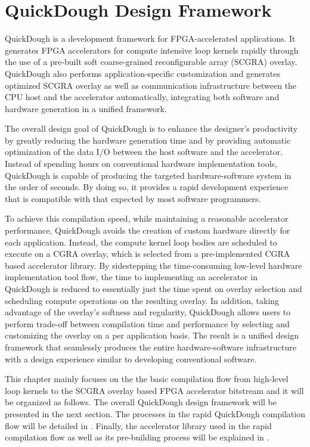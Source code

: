 \chapter{QuickDough Design Framework} \label{chapter:framework}
QuickDough is a development framework for FPGA-accelerated applications. It generates FPGA accelerators for compute intensive loop kernels rapidly through the use of a pre-built soft coarse-grained reconfigurable array (SCGRA) overlay. QuickDough also performs application-specific customization and generates optimized SCGRA overlay as well as communication infrastructure between the CPU host and the accelerator automatically, integrating both software and hardware generation in a unified framework.

The overall design goal of QuickDough is to enhance the designer's productivity by greatly reducing the hardware generation time and by providing automatic optimization of the data I/O between the host software and the accelerator. Instead of spending hours on conventional hardware implementation tools, QuickDough is capable of producing the targeted hardware-software system in the order of seconds. By doing so, it provides a rapid development experience that is compatible with that expected by most software programmers.

To achieve this compilation speed, while maintaining a reasonable accelerator performance, QuickDough avoids the creation of custom hardware directly for each application. Instead, the compute kernel loop bodies are scheduled to execute on a CGRA overlay, which is selected from a pre-implemented CGRA based accelerator library. By sidestepping the time-consuming low-level hardware implementation tool flow, the time to implementing an accelerator in QuickDough is reduced to essentially just the time spent on overlay selection and scheduling compute operations on the resulting overlay. In addition, taking advantage of the overlay's softness and regularity, QuickDough allows users to perform trade-off between compilation time and performance by selecting and customizing the overlay on a per application basis. The result is a unified design framework that seamlessly produces the entire hardware-software infrastructure with a design experience similar to developing conventional software.

This chapter mainly focuses on the the basic compilation flow from high-level loop kernels to the SCGRA overlay based FPGA accelerator bitstream and it will be organized as follows. The overall QuickDough design framework will be presented in the next section. The processes in the rapid QuickDough compilation flow will be detailed in . Finally, the accelerator library used in the rapid compilation flow as well as its pre-building process will be explained in .    

